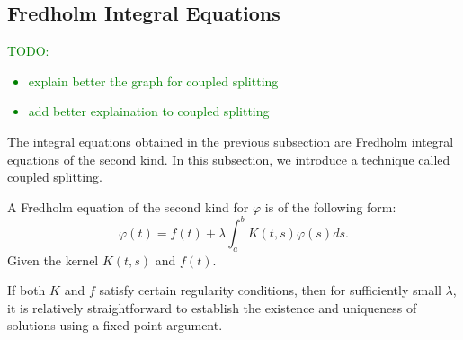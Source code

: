 \documentclass[a4paper,12pt]{article}
\begin{document}
\subsection{Fredholm Integral Equations}

\textcolor{green}{
    TODO:
    \begin{itemize}
        \item explain better the graph for coupled splitting
        \item add better explaination to coupled splitting
    \end{itemize}
}

The integral equations obtained in the previous subsection are Fredholm integral
equations of the second kind. In this subsection, we introduce a technique called
coupled splitting.


\begin{definition}
    A Fredholm equation of the second kind for $\varphi$  is of the following form:
    \begin{equation}
        \varphi(t)=f(t)+\lambda \int_a^b K(t, s) \varphi(s) ds.
    \end{equation}
    Given the kernel  $K(t, s)$  and  $ f(t)$.
\end{definition}

If both $K$ and $f$ satisfy certain regularity conditions, then for sufficiently
small $\lambda$, it is relatively straightforward to establish the existence
and uniqueness of solutions using a fixed-point argument.

\end{document}
